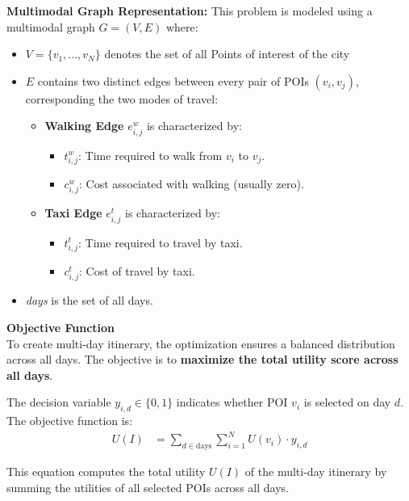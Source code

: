 \noindent \textbf{Multimodal Graph Representation:}
This problem is modeled using a multimodal graph \( G = (V, E) \) where:

\begin{itemize}
    \item \( V = \{v_1, ..., v_N\} \) denotes the set of all Points of interest of the city
    \item \( E \) contains two distinct edges between every pair of POIs \( (v_i, v_j) \), corresponding the two modes of travel:
    \begin{itemize}
        \item \textbf{Walking Edge} \( e^{w}_{i,j} \) is characterized by:
        \begin{itemize}
            \item \( t^{w}_{i,j} \): Time required to walk from \( v_i \) to \( v_j \).
            \item \( c^{w}_{i,j} \): Cost associated with walking (usually zero).
        \end{itemize}
        \item \textbf{Taxi Edge} \( e^{t}_{i,j} \) is characterized by:
        \begin{itemize}
            \item \( t^{t}_{i,j} \): Time required to travel by taxi.
            \item \( c^{t}_{i,j} \): Cost of travel by taxi.
        \end{itemize}
    \end{itemize}
    \item \textit{days} is the set of all days.
\end{itemize}

\noindent \textbf{Objective Function}\\
To create multi-day itinerary, the optimization ensures a balanced distribution across all days. The objective is to \textbf{maximize the total utility score across all days}.

The decision variable \( y_{i,d} \in \{0,1\} \) indicates whether POI \( v_i \) is selected on day \( d \). The objective function is:
\begin{align}
U(I) &= \sum_{d \in \text{days}} \sum_{i = 1}^{N} U(v_i) \cdot y_{i,d} \label{eq:multi_day_binary}
\end{align}

This equation computes the total utility $U(I)$ of the multi-day itinerary by summing the utilities of all selected POIs across all days.

